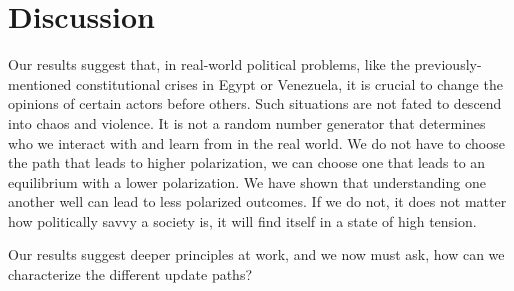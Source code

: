 \documentclass[11pt,letterpaper]{article}
\begin{document}
\section{Discussion}

Our results suggest that, in real-world political problems, 
like the previously-mentioned constitutional crises in Egypt or Venezuela,
it is crucial to change the opinions of certain actors before others. Such 
situations are not fated to descend into chaos and violence. It is not a
random number generator that determines who we interact with and learn from 
in the real world. We do not have to choose the path that leads to higher 
polarization, we can choose one that leads to an equilibrium with a lower
polarization.  We have shown that understanding one another well can lead to 
less polarized outcomes. If we do not, it does not matter how politically savvy
a society is, it will find itself in a state of high tension.

Our results suggest deeper principles at work, and we now must ask, how can
we characterize the different update paths?

\clearpage



\clearpage



\setlength{\bibleftmargin}{.125in}
\setlength{\bibindent}{-\bibleftmargin}


\end{document}
